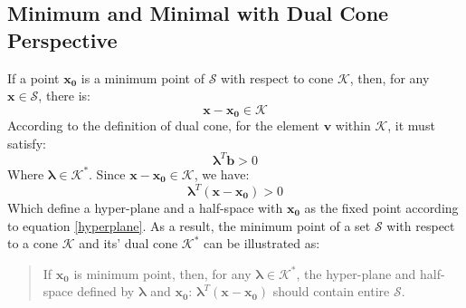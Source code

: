 \documentclass[10pt,a4paper]{article}
\begin{document}
\subsection{Minimum and Minimal with Dual Cone Perspective}
If a point $\mathbf{x_{0}}$ is a minimum point of $\mathcal{S}$ with respect to cone $\mathcal{K}$, then, for any $\mathbf{x} \in \mathcal{S}$, there is:
\begin{equation*}
	\mathbf{x} - \mathbf{x_{0}} \in \mathcal{K}
\end{equation*}
According to the definition of dual cone, for the element $\mathbf{v}$ within $\mathcal{K}$, it must satisfy:
\begin{equation*}
	\mathbf{\lambda}^{T} \mathbf{b} > 0
\end{equation*}
Where $\mathbf{\lambda} \in \mathcal{K}^{*}$. Since $\mathbf{x} - \mathbf{x_{0}} \in \mathcal{K}$, we have:
\begin{equation*}
	\mathbf{\lambda}^{T} (\mathbf{x} - \mathbf{x_{0}}) > 0
\end{equation*}
Which define a hyper-plane and a half-space with $\mathbf{x_{0}}$ as the fixed point according to equation \ref{hyperplane}. As a result, the minimum point of a set $\mathcal{S}$ with respect to a cone $\mathcal{K}$ and its' dual cone $\mathcal{K}^{*}$ can be illustrated as:
\begin{quote}
	If $\mathbf{x_{0}}$ is minimum point, then, for any $\mathbf{\lambda} \in \mathcal{K}^{*}$, the hyper-plane and half-space defined by $\mathbf{\lambda}$ and $\mathbf{x_{0}}$: $\mathbf{\lambda}^{T} (\mathbf{x} - \mathbf{x_{0}})$ should contain entire $\mathcal{S}$.
\end{quote}
\end{document}
